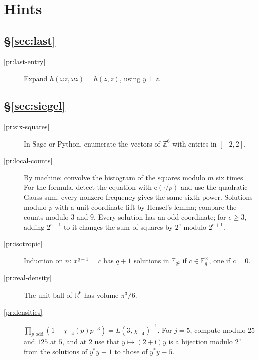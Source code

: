 \documentclass[reqno]{amsart}
\theoremstyle{definition}
\theoremstyle{plain}
\theoremstyle{remark}
\newcommand{\Z}{\mathbb{Z}}
\newcommand{\R}{\mathbb{R}}
\newcommand{\ii}{\mathrm{i}}
\begin{document}
\section*{Hints}

\subsection*{\S\ref{sec:last}}
\begin{description}
\item[\ref{pr:last-entry}] Expand \(h(\omega z,\omega z)=h(z,z)\), using \(y\perp z\).
\end{description}

\subsection*{\S\ref{sec:siegel}}
\begin{description}
\item[\ref{pr:six-squares}] In Sage or Python, enumerate the vectors of \(\Z^6\) with entries in \([-2,2]\).
\item[\ref{pr:local-counts}] By machine: convolve the histogram of the squares modulo \(m\) six times.  For the formula, detect the equation with \(\mathrm e(\cdot/p)\) and use the quadratic Gauss sum: every nonzero frequency gives the same sixth power.  Solutions modulo \(p\) with a unit coordinate lift by Hensel's lemma; compare the counts modulo \(3\) and \(9\).  Every solution has an odd coordinate; for \(e\ge3\), adding \(2^{e-1}\) to it changes the sum of squares by \(2^e\) modulo \(2^{e+1}\).
\item[\ref{pr:isotropic}] Induction on \(n\): \(x^{q+1}=c\) has \(q+1\) solutions in \(\mathbb F_{q^2}\) if \(c\in\mathbb F_q^\times\), one if \(c=0\).
\item[\ref{pr:real-density}] The unit ball of \(\R^6\) has volume \(\pi^3/6\).
\item[\ref{pr:densities}] \(\prod_{p\text{ odd}}(1-\chi_{-4}(p)p^{-3})=L(3,\chi_{-4})^{-1}\).  For \(j=5\), compute modulo \(25\) and \(125\) at \(5\), and at \(2\) use that \(y\mapsto(2+\ii)y\) is a bijection modulo \(2^e\) from the solutions of \(y^*y\equiv1\) to those of \(y^*y\equiv5\).
\end{description}
\end{document}
